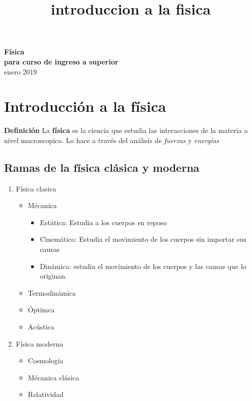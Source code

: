 \documentclass[11pt]{article}
\theoremstyle{definition}
\begin{document}
\setcounter{section}{0}
\setcounter{numact}{1}
\title{introduccion a la fisica}

\newenvironment{myblock}[2][]{%
    \tcolorbox[beamer,%
    noparskip,breakable,
 	colback      = blue!5!white,
  	colframe     = blue!75!black,
  	fonttitle    = \bfseries,
  	colbacktitle = blue!85!black,
    title        = #2,#1]}%
    {\endtcolorbox}

\thispagestyle{empty}

\begin{center}
{\LARGE \bf Física}\\
{\large  \bf para curso de ingreso a superior}\\
enero 2019
\end{center}
\section{Introducción a la física}
\begin{shaded}
\textbf{Definición} \newline
La \textbf{física} es la ciencia que estudia las interacciones de la materia a nivel macroscopico. Lo hace a través del análisis de \textit{fuerzas} y \textit{energías}
\end{shaded}
\subsection{Ramas de la física clásica y moderna}
\begin{enumerate}
   \item Física clasica
   \begin{itemize}
     \item Mécanica
     \begin{itemize}
         \item Estática: Estudia a los cuerpos en reposo
         \item Cinemática: Estudia el movimiento de los cuerpos sin importar sus causas
         \item Dinámica: estudia el movimiento de los cuerpos y las causas que lo originan.
     \end{itemize}
     \item Termodinámica
     \item Óptimca
     \item Acústica
   \end{itemize}
   \item Física moderna
   \begin{itemize}
       \item Cosmología
       \item Mécanica clásica
       \item Relatividad
   \end{itemize}
\end{enumerate}
\end{document}
